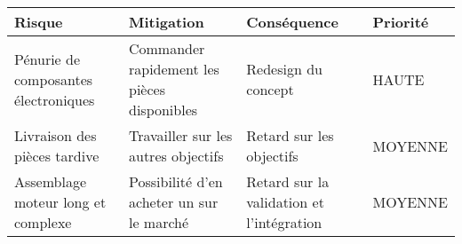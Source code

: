 \begin{tabularx}{\linewidth}{
    |>{\let\newline\\\hsize=0.40\hsize}X|%
    >{\hsize=0.25\hsize}X|%
    >{\hsize=0.25\hsize}X|%
    >{\centering\arraybackslash\hsize=0.1\hsize}X|%
  }
    \hline
    \textbf{Risque} & \textbf{Mitigation} & \textbf{Conséquence} & \textbf{Priorité}\\\hline
    Pénurie de composantes électroniques & Commander rapidement les pièces disponibles & Redesign du concept & HAUTE\\\hline
    Livraison des pièces tardive & Travailler sur les autres objectifs & Retard sur les objectifs & MOYENNE\\\hline
    Assemblage moteur long et complexe & Possibilité d'en acheter un sur le marché & Retard sur la validation et l'intégration & MOYENNE\\\hline
  \end{tabularx}
  
  

  
